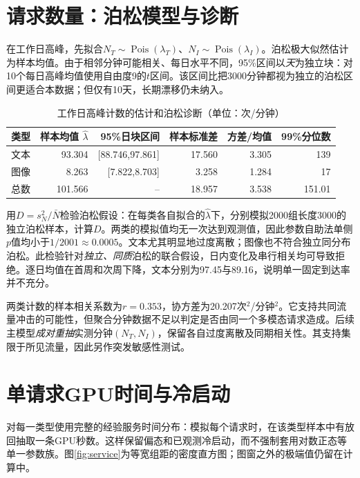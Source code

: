 \documentclass[UTF8,a4paper,11pt,fontset=fandol]{ctexart}
\numberwithin{equation}{section}
\begin{document}
\section{请求数量：泊松模型与诊断}
在工作日高峰，先拟合$N_T\sim\operatorname{Pois}(\lambda_T)$、$N_I\sim\operatorname{Pois}(\lambda_I)$。泊松极大似然估计为样本均值。由于相邻分钟可能相关、每日水平不同，95\%区间以\emph{天}为独立块：对10个每日高峰均值使用自由度9的$t$区间。该区间比把3000分钟都视为独立的泊松区间更适合本数据；但仅有10天，长期漂移仍未纳入。

\begin{table}[htbp]\centering
\caption{工作日高峰计数的估计和泊松诊断（单位：次/分钟）}
\begin{tabular}{lrrrrr}\toprule
类型&样本均值 $\hat\lambda$&95\%日块区间&样本标准差&方差/均值&99\%分位数\\\midrule
文本&93.304&[88.746,97.861]&17.560&3.305&139\\
图像&8.263&[7.822,8.703]&3.258&1.284&17\\
总数&101.566&--&18.957&3.538&151.01\\\bottomrule
\end{tabular}
\label{tab:counts}
\end{table}

用$D=s_N^2/\bar N$检验泊松假设：在每类各自拟合的$\hat\lambda$下，分别模拟2000组长度3000的独立泊松样本，计算$D$。两类的模拟值均无一次达到观测值，因此参数自助法单侧$p$值均小于$1/2001\approx0.0005$。文本尤其明显地过度离散；图像也不符合独立同分布泊松。此检验针对\emph{独立、同质}泊松的联合假设，日内变化及串行相关均可导致拒绝。逐日均值在首周和次周下降，文本分别为97.45与89.16，说明单一固定到达率并不充分。

两类计数的样本相关系数为$r=0.353$，协方差为20.207次$^2$/分钟$^2$。它支持共同流量冲击的可能性，但聚合分钟数据不足以判定是否由同一个多模态请求造成。后续主模型\emph{成对重抽}实测分钟$(N_T,N_I)$，保留各自过度离散及同期相关性。其支持集限于所见流量，因此另作突发敏感性测试。

\section{单请求GPU时间与冷启动}
对每一类型使用完整的经验服务时间分布：模拟每个请求时，在该类型样本中有放回抽取一条GPU秒数。这样保留偏态和已观测冷启动，而不强制套用对数正态等单一参数族。图\ref{fig:service}为等宽组距的密度直方图；图窗之外的极端值仍留在计算中。
\end{document}

